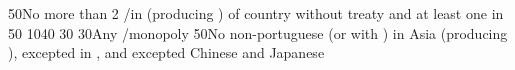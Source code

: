 %
{}{50}{No more than 2 \COL/\TP in \continentAsia (producing \POSPICE) of
  country without treaty and at least one \COL in \continentBrazil}%
%
%
%
{}{50}{}%
%
{10}{40}{}%
%
{}{30}{}%
%
{}{30}{Any \CTZ/\STZ monopoly}%
%
{}{50}{No non-portuguese \TP (or with \dipAT) in Asia (producing \POSPICE),
  excepted in , and excepted Chinese and Japanese
  \TP}%

\makeatother

